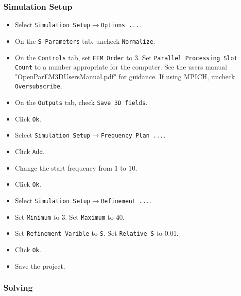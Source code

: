 \documentclass[titlepage]{article}
\renewcommand\_{\textunderscore\linebreak[1]}
\begin{document}
\subsubsection{Simulation Setup}

\begin{itemize}
\item Select \texttt{Simulation Setup}$\rightarrow$\texttt{Options ...}.
\item On the \texttt{S-Parameters} tab, uncheck \texttt{Normalize}.
\item On the \texttt{Controls} tab, set \texttt{FEM Order} to 3.  Set \texttt{Parallel Processing Slot Count} to a number appropriate for the computer.  See the users manual "OpenParEM3D\_Users\_Manual.pdf" for guidance.  If using MPICH, uncheck \texttt{Oversubscribe}.
\item On the \texttt{Outputs} tab, check \texttt{Save 3D fields}.
\item Click \texttt{Ok}.
\item Select \texttt{Simulation Setup}$\rightarrow$\texttt{Frequency Plan ...}.
\item Click \texttt{Add}.
\item Change the start frequency from $1$ to $10$.
\item Click \texttt{Ok}.
\item Select \texttt{Simulation Setup}$\rightarrow$\texttt{Refinement ...}.
\item Set \texttt{Minimum} to $3$.  Set \texttt{Maximum} to $40$.
\item Set \texttt{Refinement Varible} to \texttt{S}.  Set \texttt{Relative S} to $0.01$.
\item Click \texttt{Ok}.
\item Save the project.
\end{itemize}

\subsubsection{Solving}
\end{document}
